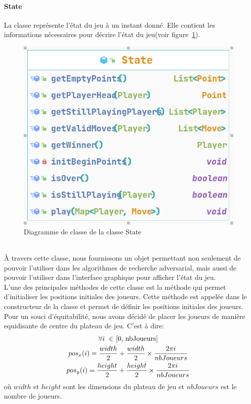 \tocless\paragraph{State}
La classe  représente l'état du jeu à un instant donné. Elle contient les informations nécessaires pour décrire l'état du jeu(voir figure~\ref{fig:state}).
\begin{figure}[ht!]
	\centering
	\includegraphics[scale=0.4]{diagrames/State}
	\caption{Diagramme de classe de la classe State}
	\label{fig:state}
\end{figure}\\

À travers cette classe, nous fournissons un objet permettant non seulement de pouvoir l'utiliser dans les algorithmes de recherche adversarial, mais aussi de pouvoir l'utiliser dans l'interface graphique pour afficher l'état du jeu.\\

L'une des principales méthodes de cette classe est la méthode  qui permet d'initialiser les positions initiales des joueurs.
Cette méthode est appelée dans le constructeur de la classe  et permet de définir les positions initiales des joueurs. Pour un souci d'équitabilité, 
nous avons décidé de placer les joueurs de manière equidisante de centre du plateau de jeu. C'est à dire:
\begin{multline}
	\forall i ~\in ~$[0, nbJoueurs[$\\
	pos_x(i) = \frac{width}{2} + \frac{width}{2} \times \frac{2\pi i}{nbJoueurs}\\
	pos_y(i) = \frac{height}{2} + \frac{height}{2} \times \frac{2\pi i}{nbJoueurs}\\
\end{multline}
où $width$ et $height$ sont les dimensions du plateau de jeu et $nbJoueurs$ est le nombre de joueurs.\\

